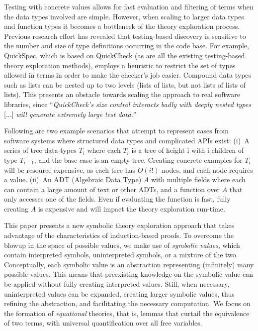 Testing with concrete values allows for fast evaluation and filtering of terms when the data types involved are simple.
However, when scaling to larger data types and function types it becomes a bottleneck of the theory exploration process.
Previous research effort has revealed that testing-based discovery is sensitive to the number and size of type definitions occurring in the code base.
For example, QuickSpec, which is based on QuickCheck (as are all the existing testing-based theory exploration methods), employs a heuristic to restrict the set of types allowed in terms in order to make the checker's job easier.
Compound data types such as lists can be nested up to two levels (lists of lists, but not lists of lists of lists).
This presents an obstacle towards scaling the approach to real software libraries, since ``\textit{QuickCheck's size control
interacts badly with deeply nested types} [...] \textit{will generate extremely large test data.}''~\cite{JFP2017:Smallbone}

Following are two example scenarios that attempt to represent cases from software systems where structured data types and complicated APIs exist:
(i)~A series of tree data-types $T_i$ where each $T_i$ is a tree of height i with i children of type $T_{i-1}$, and the base case is an empty tree.
Creating concrete examples for $T_i$ will be resource expensive, as each tree has $O(i!)$ nodes, and each node requires a value.
(ii)~An ADT (Algebraic Data Type) $A$ with multiple fields where each can contain a large amount of text or other ADTs, and a function over $A$ that only accesses one of the fields.
Even if evaluating the function is fast, fully creating $A$ is expensive and will impact the theory exploration run-time.

This paper presents a new symbolic theory exploration approach that takes advantage of the characteristics of induction-based proofs.
To overcome the blowup in the space of possible values, we make use of \emph{symbolic values}, which contain interpreted symbols, uninterpreted symbols, or a mixture of the two. 
Conceptually, each symbolic value is an abstraction representing (infinitely) many possible values. 
This means that preexisting knowledge on the symbolic value can be applied without fully creating interpreted values.
Still, when necessary, uninterpreted values can be expanded, creating larger symbolic values, thus refining the abstraction, and facilitating the necessary computation.
We focus on the formation of \emph{equational} theories, that is, lemmas that curtail the equivalence of two terms, with universal quantification over all free variables.

